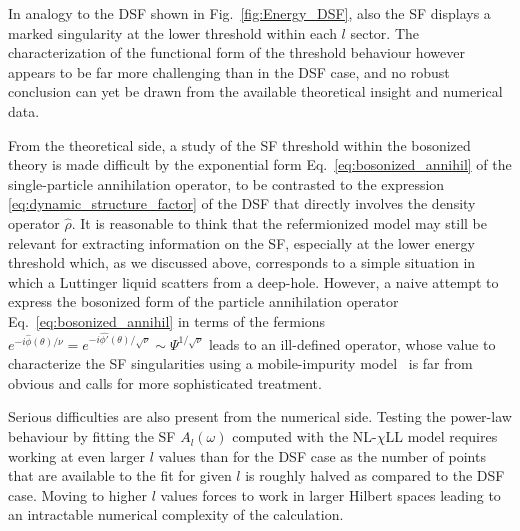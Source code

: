 \documentclass[twocolumn,pra,superscriptaddress,noshowpacs]{revtex4}
\newcommand{\nlchill}{NL-$\chi$LL }
\begin{document}



In analogy to the DSF shown in Fig.~\ref{fig:Energy_DSF}, also the SF displays a marked singularity at the lower threshold within each $l$ sector. The characterization of the functional form of the threshold behaviour however appears to be far more challenging than in the DSF case, and no robust conclusion can yet be drawn from the available theoretical insight and numerical data.

From the theoretical side, a study of the SF threshold within the bosonized theory is made difficult by the exponential form Eq.~\eqref{eq:bosonized_annihil} of the single-particle annihilation operator, to be contrasted to the expression \eqref{eq:dynamic_structure_factor} of the DSF that directly involves the density operator $\hat{\rho}$.
It is reasonable to think that the refermionized model may still be relevant for extracting information on the SF, especially at the lower energy threshold which, as we discussed above, corresponds to a simple situation in which a Luttinger liquid scatters from a deep-hole. However, a naive attempt to express the bosonized form of the particle annihilation operator Eq.~\eqref{eq:bosonized_annihil} in terms of the fermions $e^{-i\hat{\phi}(\theta)/\nu}=e^{-i\hat{\phi'}(\theta)/\sqrt{\nu}}\sim\Psi^{1/\sqrt{\nu}}$ leads to an ill-defined operator, whose value to characterize the SF singularities using a mobile-impurity model~\cite{ImambekovGlazman_RMP_2012} is far from obvious and calls for more sophisticated treatment. 

Serious difficulties are also present from the numerical side. Testing the power-law behaviour by fitting the SF $A_l(\omega)$ computed with the \nlchill model
requires working at even larger $l$ values than for the DSF case as the number of points that are available to the fit  for given $l$ is roughly halved as compared to the DSF case. Moving to higher $l$ values forces to work in larger Hilbert spaces leading to an intractable numerical complexity of the calculation.
\end{document}
